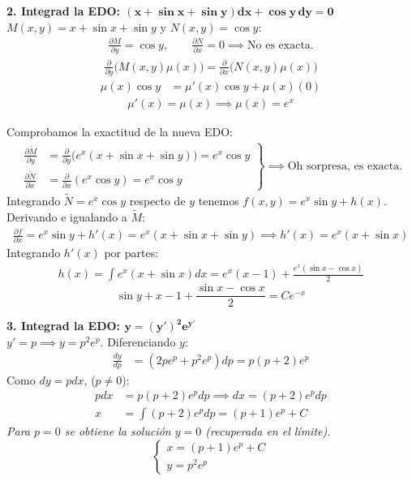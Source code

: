 \documentclass[11pt, a4paper]{article}
\begin{document}
\noindent\textbf{2. Integrad la EDO: $\bm{(x+\sin x+\sin y)dx + \cos y \, dy = 0}$} \\
$M(x,y) = x+\sin x+\sin y$ y $N(x,y) = \cos y$:
\begin{align*}
\frac{\partial M}{\partial y} = \cos y, \qquad \frac{\partial N}{\partial x} = 0 \implies \text{No es exacta.}
\end{align*}
\begin{align*}
\frac{\partial}{\partial y}\big(M(x,y)\mu(x)\big) = \frac{\partial}{\partial x}\big(N(x,y)\mu(x)\big)
\end{align*}
\begin{align*}
\mu(x)\cos y &= \mu'(x)\cos y + \mu(x)(0)
\end{align*}
\begin{align*}
\mu'(x) = \mu(x) \implies \mu(x) = e^x
\end{align*}

Comprobamos la exactitud de la nueva EDO:
\begin{align*}
\left.\begin{aligned}
\frac{\partial \tilde{M}}{\partial y} &= \frac{\partial}{\partial y}\big(e^x(x+\sin x+\sin y)\big) = e^x\cos y \\[1.5ex]
\frac{\partial \tilde{N}}{\partial x} &= \frac{\partial}{\partial x}(e^x\cos y) = e^x\cos y
\end{aligned}\right\} \implies \text{Oh sorpresa, es exacta.}
\end{align*}
Integrando $\tilde{N} = e^x\cos y$ respecto de $y$ tenemos $f(x,y) = e^x\sin y + h(x)$. Derivando e igualando a $\tilde{M}$:
\begin{align*}
\frac{\partial f}{\partial x} = e^x\sin y + h'(x) = e^x(x+\sin x+\sin y) \implies h'(x) = e^x(x+\sin x)
\end{align*}
Integrando $h'(x)$ por partes:
\begin{align*}
h(x) = \int e^x(x+\sin x) dx = e^x(x-1) + \frac{e^x(\sin x - \cos x)}{2}
\end{align*}
\[
\boxed{\sin y + x - 1 + \frac{\sin x - \cos x}{2} = C e^{-x}}
\]


\noindent\textbf{3. Integrad la EDO: $\bm{y = (y')^2 e^{y'}}$} \\
$y' = p \implies y = p^2 e^p$. Diferenciando $y$:
\begin{align*}
\frac{dy}{dp} &= (2pe^p + p^2 e^p)dp = p(p+2)e^p
\end{align*}
Como $dy = p dx$, ($p\neq 0$):
\begin{align*}
p dx &= p(p+2)e^p dp \implies dx = (p+2)e^p dp \\
x &= \int (p+2)e^p dp = (p+1)e^p + C
\end{align*}
\textit{Para $p=0$ se obtiene la solución $y=0$ (recuperada en el límite).}
\[
\boxed{\begin{cases} x = (p+1)e^p + C \\ y = p^2 e^p \end{cases}}
\]
\end{document}

